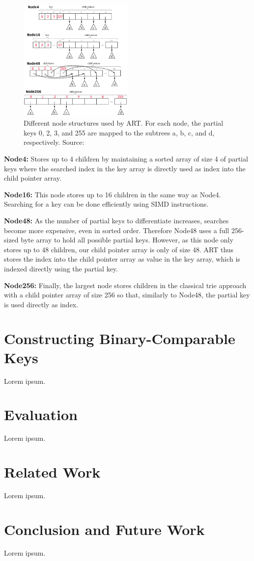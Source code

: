 \documentclass[acmtog, nonacm]{acmart}
\begin{document}
\begin{figure}
    \centering
    \includegraphics[width=0.5\textwidth]{images/03-art-node-types.png}
    \caption{Different node structures used by ART. For each node, the partial keys 0, 2, 3, and 255 are mapped to the subtrees a, b, c, and d, respectively.
    Source: \cite{6544812}}
    \label{fig:trie-mem}
\end{figure}

\textbf{Node4:} Stores up to 4 children by maintaining a sorted array of size 4 of partial keys where the searched index 
in the key array is directly used as index into the child pointer array.

\textbf{Node16:} This node stores up to 16 children in the same way as Node4. Searching for a key can be done 
efficiently using SIMD instructions.

\textbf{Node48:} As the number of partial keys to differentiate increases, searches become more expensive, even in 
sorted order. Therefore Node48 uses a full 256-sized byte array to hold all possible partial keys. However, as this 
node only stores up to 48 children, our child pointer array is only of size 48. ART thus stores the index into the 
child pointer array as value in the key array, which is indexed directly using the partial key.

\textbf{Node256:} Finally, the largest node stores children in the classical trie approach with a child pointer 
array of size 256 so that, similarly to Node48, the partial key is used directly as index.

\section{Constructing Binary-Comparable Keys}
Lorem ipsum.

\section{Evaluation}
Lorem ipsum.

\section{Related Work}
Lorem ipsum.

\section{Conclusion and Future Work}
Lorem ipsum.



\end{document}
